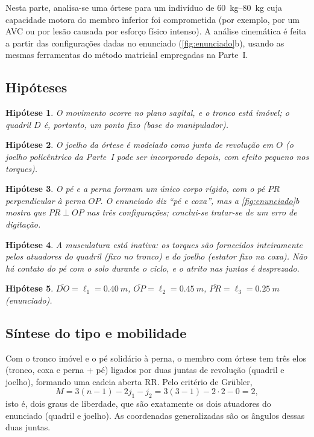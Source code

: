 \documentclass[12pt,a4paper,twoside]{article}
\newtheorem{hipotese}{Hipótese}
\numberwithin{equation}{section}
\begin{document}
Nesta parte, analisa-se uma órtese para um indivíduo de \SIrange{60}{80}{kg} cuja
capacidade motora do membro inferior foi comprometida (por exemplo, por um AVC ou por
lesão causada por esforço físico intenso). A análise cinemática é feita a partir das
configurações dadas no enunciado (\cref{fig:enunciado}b), usando as mesmas ferramentas
do método matricial empregadas na Parte~I.

\subsection{Hipóteses}

\begin{hipotese}
O movimento ocorre no plano sagital, e o tronco está imóvel; o quadril $D$ é, portanto,
um ponto fixo (base do manipulador).
\end{hipotese}
\begin{hipotese}
O joelho da órtese é modelado como junta de revolução em $O$ (o joelho policêntrico da
Parte~I pode ser incorporado depois, com efeito pequeno nos torques).
\end{hipotese}
\begin{hipotese}
O pé e a perna formam um único corpo rígido, com o pé $PR$ perpendicular à perna $OP$.
O enunciado diz ``pé e coxa'', mas a \cref{fig:enunciado}b mostra que $PR \perp OP$ nas
três configurações; conclui-se tratar-se de um erro de digitação.
\end{hipotese}
\begin{hipotese}
A musculatura está inativa: os torques são fornecidos inteiramente pelos atuadores do
quadril (fixo no tronco) e do joelho (estator fixo na coxa). Não há contato do pé com o
solo durante o ciclo, e o atrito nas juntas é desprezado.
\end{hipotese}
\begin{hipotese}
$\overline{DO} = \ell_1 = \SI{0,40}{m}$, $\overline{OP} = \ell_2 = \SI{0,45}{m}$,
$\overline{PR} = \ell_3 = \SI{0,25}{m}$ (enunciado).
\end{hipotese}

\subsection{Síntese do tipo e mobilidade}

Com o tronco imóvel e o pé solidário à perna, o membro com órtese tem três elos (tronco,
coxa e perna + pé) ligados por duas juntas de revolução (quadril e joelho), formando uma
cadeia aberta RR. Pelo critério de Grübler,
\begin{equation}
  M = 3(n-1) - 2j_1 - j_2 = 3(3-1) - 2\cdot 2 - 0 = 2,
\end{equation}
isto é, dois graus de liberdade, que são exatamente os dois atuadores do enunciado
(quadril e joelho). As coordenadas generalizadas são os ângulos dessas duas juntas.
\end{document}
